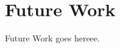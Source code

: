 \documentclass[../main.tex]{subfiles}
\begin{document}
\section{Future Work}


Future Work goes hereee.
\end{document}
